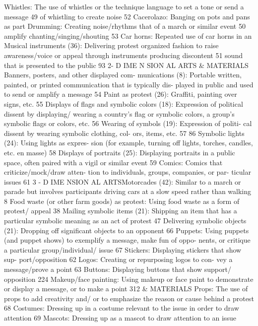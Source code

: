 \documentclass[twoside,a4paper,12pt,fleqn,openany]{extbook}
\begin{document}
 Whistles: The use of whistles or the technique
language to set a tone or send a message 49
 of whistling to create noise
 52
Cacerolazo: Banging on pots and pans as part
 Drumming: Creating noise/rhythms that
of a march or similar event
 50
 amplify chanting/singing/shouting
 53
Car horns: Repeated use of car horns in an
 Musical instruments (36): Delivering protest
organized fashion to raise awareness/voice
 or appeal through instruments producing
discontent
 51
 sound that is presented to the public
 93
2- D IME N SION AL ARTS & MATERIALS
Banners, posters, and other displayed com-
munications (8): Portable written, painted, or
printed communication that is typically dis-
played in public and used to send or amplify a
message
 54
Paint as protest (26): Graffiti, painting over
signs, etc.
 55
Displays of flags and symbolic colors (18):
Expression of political dissent by displaying/
wearing a country’s flag or symbolic colors, a
group’s symbolic flags or colors, etc.
 56
Wearing of symbols (19): Expression of politi-
cal dissent by wearing symbolic clothing, col-
ors, items, etc.
 57
86
Symbolic lights (24): Using lights as expres-
sion (for example, turning off lights, torches,
candles, etc. en masse)
 58
Displays of portraits (25): Displaying portraits
in a public space, often paired with a vigil or
similar event
 59
Comics: Comics that criticize/mock/draw atten-
tion to individuals, groups, companies, or par-
ticular issues
 61
3 - D IME NSION AL ARTSMotorcades (42): Similar to a march or parade
but involves participants driving cars at a slow
speed rather than walking
 8
Food waste (or other farm goods) as protest:
Using food waste as a form of protest/
appeal
 38
Mailing symbolic items (21): Shipping an item
that has a particular symbolic meaning as an
act of protest
 47
Delivering symbolic objects (21): Dropping off
significant objects to an opponent
 66
Puppets: Using puppets (and puppet shows)
to exemplify a message, make fun of oppo-
nents, or critique a particular group/individual/
issue
 67
Stickers: Displaying stickers that show sup-
port/opposition
 62
Logos: Creating or repurposing logos to con-
vey a message/prove a point
 63
Buttons: Displaying buttons that show support/
opposition
 224
Makeup/face painting: Using makeup or face
paint to demonstrate or display a message, or
to make a point
 312
& MATERIALS
Props: The use of props to add creativity and/
or to emphasize the reason or cause behind a
protest
 68
Costumes: Dressing up in a costume relevant
to the issue in order to draw attention
 69
Mascots: Dressing up as a mascot to draw
attention to an issue
\end{document}
